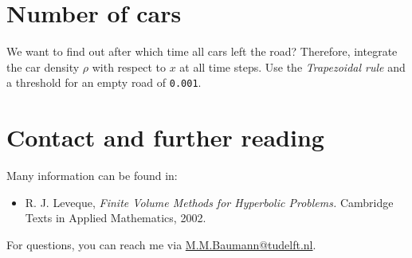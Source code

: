 \documentclass[a4paper,10pt]{article}
\begin{document}
\section{Number of cars}
We want to find out after which time all cars left the road? Therefore, integrate the car density $\rho$ with respect to $x$ at all time steps. Use the \textit{Trapezoidal rule} and a threshold for an empty road of \texttt{0.001}.
% 
\section*{Contact and further reading}
Many information can be found in:
\begin{itemize}
 \item R. J. Leveque, \textit{Finite Volume Methods for Hyperbolic Problems.} Cambridge Texts in Applied Mathematics, 2002.
\end{itemize}
For questions, you can reach me via \href{mailto:M.M.Baumann@tudelft.nl}{M.M.Baumann@tudelft.nl}.
\end{document}
